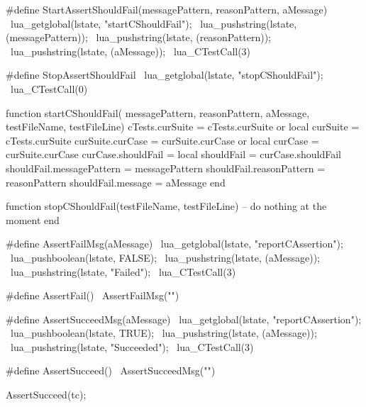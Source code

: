 
\startCHeader
#define StartAssertShouldFail(messagePattern, reasonPattern, aMessage) \
  lua_getglobal(lstate, "startCShouldFail");                           \
  lua_pushstring(lstate, (messagePattern));                            \
  lua_pushstring(lstate, (reasonPattern));                             \
  lua_pushstring(lstate, (aMessage));                                  \
  lua_CTestCall(3)

#define StopAssertShouldFail                \
  lua_getglobal(lstate, "stopCShouldFail"); \
  lua_CTestCall(0)
\stopCHeader

\startLuaCode
function startCShouldFail(
  messagePattern, reasonPattern, aMessage,
  testFileName, testFileLine)
  cTests.curSuite    = cTests.curSuite or { }
  local curSuite     = cTests.curSuite
  curSuite.curCase   = curSuite.curCase or { }
  local curCase      = curSuite.curCase
  curCase.shouldFail = { }
  local shouldFail   = curCase.shouldFail
  shouldFail.messagePattern = messagePattern
  shouldFail.reasonPattern  = reasonPattern
  shouldFail.message        = aMessage
end

function stopCShouldFail(testFileName, testFileLine)
  -- do nothing at the moment
end
\stopLuaCode

\stopTestSuite

\startTestSuite[assertFail]

\startCHeader
#define AssertFailMsg(aMessage)              \
  lua_getglobal(lstate, "reportCAssertion"); \
  lua_pushboolean(lstate, FALSE);            \
  lua_pushstring(lstate, (aMessage));        \
  lua_pushstring(lstate, "Failed");          \
  lua_CTestCall(3)
  
#define AssertFail() \
  AssertFailMsg("")
\stopCHeader

\stopTestSuite

\startTestSuite[assertSucceed]

\startCHeader
#define AssertSucceedMsg(aMessage)           \
  lua_getglobal(lstate, "reportCAssertion"); \
  lua_pushboolean(lstate, TRUE);             \
  lua_pushstring(lstate, (aMessage));        \
  lua_pushstring(lstate, "Succeeded");       \
  lua_CTestCall(3)

#define AssertSucceed() \
  AssertSucceedMsg("")
\stopCHeader


\startCTest
  AssertSucceed(tc);
\stopCTest
\stopTestCase

